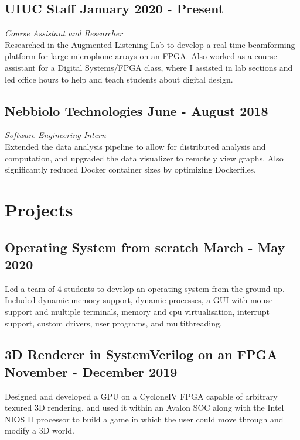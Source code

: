 \documentclass[letterpaper,11pt]{article}
\begin{document}
    \subsection{UIUC Staff \null\hfill January 2020 - Present}
    \vspace*{-2mm}
    \emph{Course Assistant and Researcher} \null\hfill \emph{}\\
    Researched in the Augmented Listening Lab to develop a real-time beamforming platform for large microphone arrays on an FPGA. Also worked as a course assistant for a Digital Systems/FPGA class, where I assisted in lab sections and led office hours to help and teach students about digital design.
    \vspace*{-2mm}
    \subsection{Nebbiolo Technologies \null\hfill June - August 2018}
    \vspace*{-2mm}
    \emph{Software Engineering Intern} \null\hfill \emph{}\\
    Extended the data analysis pipeline to allow for distributed analysis and computation, and upgraded the data visualizer to remotely view graphs. Also significantly reduced Docker container sizes by optimizing Dockerfiles.
    \vspace*{-2mm}
\section{Projects}
    \subsection{Operating System from scratch \null\hfill March - May 2020}
    \vspace*{-2mm}
    Led a team of 4 students to develop an operating system from the ground up. Included dynamic memory support, dynamic processes, a GUI with mouse support and multiple terminals, memory and cpu virtualisation, interrupt support, custom drivers, user programs, and multithreading.
    \vspace*{-2mm}
    \subsection{3D Renderer in SystemVerilog on an FPGA \null\hfill November - December 2019}
    \vspace*{-2mm}
    Designed and developed a GPU on a CycloneIV FPGA capable of arbitrary texured 3D rendering, and used it within an Avalon SOC along with the Intel NIOS II processor to build a game in which the user could move through and modify a 3D world.
    \vspace*{-2mm}
\end{document}
